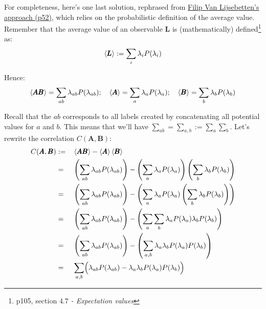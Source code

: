 \documentclass[solutions.tex]{subfiles}
\begin{document}
\fi

\hr

For completeness, here's one last solution, rephrased from
\href{https://onedrive.live.com/redir?resid=21D08FA0C16B93A5!28241&authkey=!AAM3H-TDeYaAbaI&ithint=file\%2cpdf}{Filip Van Lijsebetten’s approach (p52)},
which relies on the probabilistic definition of the average value. \\

Remember that the average value of an observable $\bm{L}$ is
(mathematically) defined\footnote{p105, section \textit{$4.7$ -
Expectation values}} as:
\[
	\left\langle \pmb{L} \right\rangle := \sum_i\lambda_iP(\lambda_i)
\]

Hence:
\[
	\left\langle \pmb{AB} \right\rangle = \sum_{ab}\lambda_{ab}P(\lambda_{ab});\quad
	\left\langle \pmb{A} \right\rangle = \sum_a\lambda_aP(\lambda_a);\quad
	\left\langle \pmb{B} \right\rangle = \sum_b\lambda_bP(\lambda_b)
\]

Recall that the $ab$ corresponds to all labels created by concatenating
all potential values for $a$ and $b$. This means that we'll have
$\sum_{ab} = \sum_{a,b} := \sum_a\sum_b$. Let's rewrite the correlation
$C(\bm{A},\bm{B})$:
\begin{equation*}\begin{aligned}
	C(\pmb{A},\pmb{B}) &:=&& \left\langle \pmb{AB} \right\rangle - \left\langle \pmb{A} \right\rangle\left\langle \pmb{B} \right\rangle \\
	~ &=&& \left(\sum_{ab}\lambda_{ab}P(\lambda_{ab})\right) -
		\left(\sum_a\lambda_aP(\lambda_a)\right)
		\left(\sum_b\lambda_bP(\lambda_b)\right) \\
	~ &=&& \left(\sum_{ab}\lambda_{ab}P(\lambda_{ab})\right) -
		\left(\sum_a\lambda_aP(\lambda_a)\left(\sum_b\lambda_bP(\lambda_b)\right)\right) \\
	~ &=&&\left(\sum_{ab}\lambda_{ab}P(\lambda_{ab})\right) -
		\left(\sum_a\sum_b\lambda_aP(\lambda_a)\lambda_bP(\lambda_b)\right) \\
	~ &=&&\left(\sum_{ab}\lambda_{ab}P(\lambda_{ab})\right) -
		\left(\sum_{a,b}\lambda_a\lambda_bP(\lambda_a)P(\lambda_b)\right) \\
	~ &=&& \sum_{a,b}\Bigl(
		\lambda_{ab}P(\lambda_{ab})-
		\lambda_a\lambda_bP(\lambda_a)P(\lambda_b)
	\Bigr) \\
\end{aligned}\end{equation*}
\end{document}
